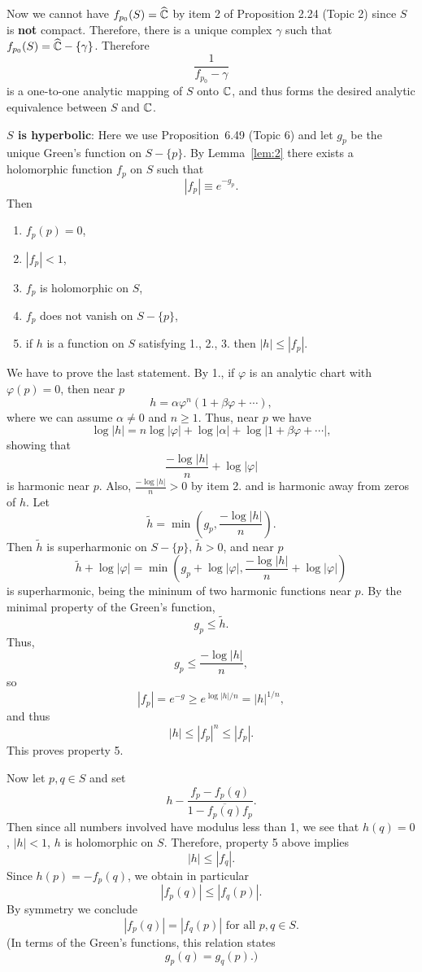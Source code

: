 \documentclass[a4paper,11pt]{article}
\begin{document}
\begin{mdframed}[skipbelow=1ex]
  Now we cannot have $f_{p_0}(S) = \widehat{{\mathbb C}}$ by item 2 of
  Proposition 2.24 (Topic 2) since $S$ is \textbf{not} compact.
  Therefore, there is a unique complex $\gamma$ such that $f_{p_0}(S)
  = \widehat{{\mathbb C}} - \{\gamma\}$.  Therefore
  $$
  \frac{1}{f_{p_0} - \gamma}
  $$
  is a one-to-one analytic mapping of $S$ onto ${\mathbb C}$, and thus forms
  the desired analytic equivalence between $S$ and ${\mathbb C}$.


  \textbf{$S$ is hyperbolic}: Here we use Proposition~6.49 (Topic 6)
  and let $g_p$ be the unique Green's function on $S - \{p\}$.  By
  Lemma~\ref{lem:2} there exists a holomorphic function $f_p$ on $S$
  such that
  $$
  |f_p| \equiv e^{-g_p}.
  $$
  Then
  \begin{enumerate}
  \item $f_p(p) = 0$,
  \item $|f_p| < 1$,
  \item $f_p$ is holomorphic on $S$,
  \item $f_p$ does not vanish on $S-\{p\}$,
  \item if $h$ is a function on $S$ satisfying 1., 2., 3. then $|h|
    \le |f_p|$.
  \end{enumerate}
  We have to prove the last statement.  By 1., if $\varphi$ is an
  analytic chart with $\varphi(p) = 0$, then near $p$
  $$
  h = \alpha \varphi^n (1 + \beta \varphi + \cdots),
  $$
  where we can assume $\alpha \ne 0$ and $n \ge 1$.  Thus, near $p$ we
  have
  $$
  \log|h| = n\log|\varphi| + \log|\alpha| + \log|1 + \beta \varphi +
  \cdots|,
  $$
  showing that
  $$
  \frac{-\log|h|}{n} + \log|\varphi|
  $$
  is harmonic near $p$.  Also, $\frac{-\log|h|}{n} > 0$ by item 2. and is
  harmonic away from zeros of $h$.  Let
  $$
  \widetilde{h} = \min(g_p, \frac{-\log|h|}{n}).
  $$
  Then $\widetilde{h}$ is superharmonic on $S - \{p\}$, $\widetilde{h}
  > 0$, and near $p$
  $$
  \widetilde{h} + \log|\varphi| 
  = \min(g_p + \log|\varphi|, \frac{-\log|h|}{n} + \log|\varphi|)
  $$
  is superharmonic, being the mininum of two harmonic functions near
  $p$.  By the minimal property of the Green's function,
  $$
  g_p \le \widetilde{h}.
  $$
  Thus,
  $$
  g_p \le \frac{-\log|h|}{n},
  $$
  so
  $$
  |f_p| = e^{-g} \ge e^{\log|h|/n} = |h|^{1/n},
  $$
  and thus
  $$
  |h| \le |f_p|^n \le |f_p|.
  $$
  This proves property 5.

  Now let $p,q \in S$ and set
  $$
  h - \frac{f_p - f_p(q)}{1 - \overline{f_p(q)}f_p}.
  $$
  Then since all numbers involved have modulus less than 1, we see
  that $h(q) = 0$, $|h| < 1$, $h$ is holomorphic on $S$.  Therefore,
  property 5 above implies
  $$
  |h| \le |f_q|.
  $$
  Since $h(p) = -f_p(q)$, we obtain in particular
  $$
  |f_p(q)| \le |f_q(p)|.
  $$
  By symmetry we conclude
  $$
  |f_p(q)| = |f_q(p)| \text{ for all } p, q \in S.
  $$
  (In terms of the Green's functions, this relation states
  $$
  g_p(q) = g_q(p).)
  $$


\end{mdframed}
\end{document}
